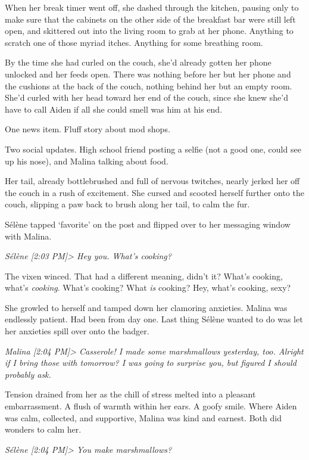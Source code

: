 When her break timer went off, she dashed through the kitchen, pausing only to make sure that the cabinets on the other side of the breakfast bar were still left open, and skittered out into the living room to grab at her phone. Anything to scratch one of those myriad itches. Anything for some breathing room.

By the time she had curled on the couch, she'd already gotten her phone unlocked and her feeds open. There was nothing before her but her phone and the cushions at the back of the couch, nothing behind her but an empty room. She'd curled with her head toward her end of the couch, since she knew she'd have to call Aiden if all she could smell was him at his end.

One news item. Fluff story about mod shops.

Two social updates. High school friend posting a selfie (not a good one, could see up his nose), and Malina talking about food.

Her tail, already bottlebrushed and full of nervous twitches, nearly jerked her off the couch in a rush of excitement. She cursed and scooted herself further onto the couch, slipping a paw back to brush along her tail, to calm the fur.

Sélène tapped `favorite' on the post and flipped over to her messaging window with Malina.

\emph{Sélène {[}2:03 PM{]}\textgreater{} Hey you. What's cooking?}

The vixen winced. That had a different meaning, didn't it? What's cooking, what's \emph{cooking}. What's cooking? What \emph{is} cooking? Hey, what's cooking, sexy?

She growled to herself and tamped down her clamoring anxieties. Malina was endlessly patient. Had been from day one. Last thing Sélène wanted to do was let her anxieties spill over onto the badger.

\emph{Malina {[}2:04 PM{]}\textgreater{} Casserole! I made some marshmallows yesterday, too. Alright if I bring those with tomorrow? I was going to surprise you, but figured I should probably ask.}

Tension drained from her as the chill of stress melted into a pleasant embarrassment. A flush of warmth within her ears. A goofy smile. Where Aiden was calm, collected, and supportive, Malina was kind and earnest. Both did wonders to calm her.

\emph{Sélène {[}2:04 PM{]}\textgreater{} You make marshmallows?}

